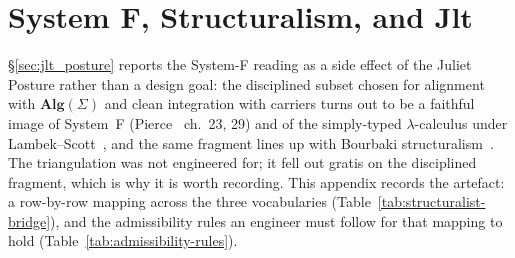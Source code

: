 \documentclass[11pt, a4paper]{article}
\begin{document}
\appendix


\clearpage
\section{System F, Structuralism, and $\mathbf{Jlt}$}
\label{app:jlt-systemf}

§\ref{sec:jlt_posture} reports the System-F reading as a side effect of the Juliet Posture rather than a design goal: the disciplined subset chosen for alignment with $\mathbf{Alg}(\Sigma)$ and clean integration with  carriers turns out to be a faithful image of System~F (Pierce~\cite{pierce2002tapl} ch.~23, 29) and of the simply-typed $\lambda$-calculus under Lambek--Scott~\cite{lambek1988introduction}, and the same fragment lines up with Bourbaki structuralism~\cite{marquis2022structuralist}.
The triangulation was not engineered for; it fell out gratis on the disciplined fragment, which is why it is worth recording.
This appendix records the artefact: a row-by-row mapping across the three vocabularies (Table~\ref{tab:structuralist-bridge}), and the admissibility rules an engineer must follow for that mapping to hold (Table~\ref{tab:admissibility-rules}).
\end{document}
